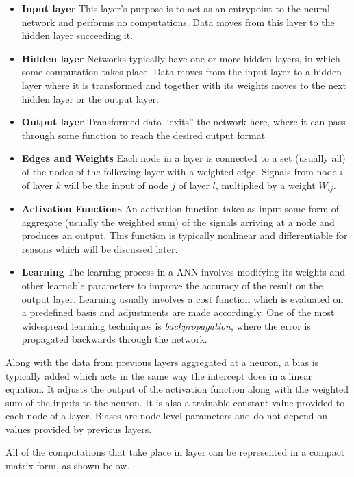 \begin{itemize}
\item \textbf{Input layer} This layer's purpose is to act as an
  entrypoint to the neural network and performs no computations. Data moves from
  this layer to the hidden layer succeeding it.
\item \textbf{Hidden layer} Networks typically have one or more
  hidden layers, in which some computation takes place. Data moves from the input
  layer to a hidden layer where it is transformed and together with its weights
  moves to the next hidden layer or the output layer.
\item \textbf{Output layer} Transformed data ``exits'' the network here,
  where it can pass through some function to reach the desired output
  format
\item \textbf{Edges and Weights} Each node in a layer is connected
  to a set (usually all) of the nodes of the following layer with a
  weighted edge. Signals from node $i$ of layer $k$ will be the input
  of node $j$ of layer $l$, multiplied by a weight $W_{ij}$. 
\item \textbf{Activation Functions} An activation function takes as
  input some form of aggregate (usually the weighted sum) of the signals
  arriving at a node and produces an output. This function is typically
  nonlinear and differentiable for reasons which will be discussed later.
\item \textbf{Learning} The learning process in a ANN involves modifying
  its weights and other learnable parameters to improve the accuracy
  of the result on the output layer. Learning usually involves a cost
  function which is evaluated on a predefined basis and adjustments are
  made accordingly. One of the most widespread learning techniques is
  \textit{backpropagation}, where the error is propagated backwards
  through the network.
  
\end{itemize}
Along with the data from previous layers aggregated at a neuron, a bias
is typically added which acts in the same way the intercept does in a
linear equation. It adjusts the output of the activation function along
with the weighted sum of the inputs to the neuron. It is also a trainable
constant value provided to each node of a layer. Biases are node level
parameters and do not depend on values provided by previous layers.

All of the computations that take place in layer can be represented in
a compact matrix form, as shown below.


